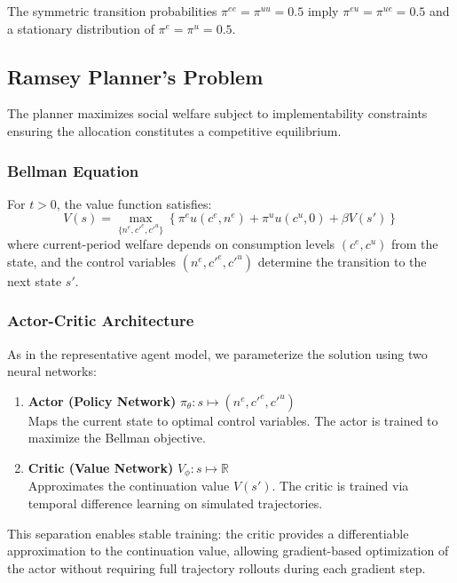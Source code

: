 \noindent The symmetric transition probabilities $\pi^{ee} = \pi^{uu} = 0.5$ imply $\pi^{eu} = \pi^{ue} = 0.5$ and a stationary distribution of $\pi^e = \pi^u = 0.5$.


\subsection{Ramsey Planner's Problem}

The planner maximizes social welfare subject to implementability constraints ensuring the allocation constitutes a competitive equilibrium.

\subsubsection{Bellman Equation}
For $t > 0$, the value function satisfies:
\begin{equation}\label{eq:bellman_ha}
    V(s) = \max_{\{n^e, c'^e, c'^u\}} \left\{ \pi^e u(c^e, n^e) + \pi^u u(c^u, 0) + \beta V(s') \right\}
\end{equation}
where current-period welfare depends on consumption levels $(c^e, c^u)$ from the state, and the control variables $(n^e, c'^e, c'^u)$ determine the transition to the next state $s'$.

\subsubsection{Actor-Critic Architecture}
As in the representative agent model, we parameterize the solution using two neural networks:
\begin{enumerate}
    \item \textbf{Actor (Policy Network)} $\pi_\theta: s \mapsto (n^e, c'^e, c'^u)$\\
    Maps the current state to optimal control variables. The actor is trained to maximize the Bellman objective.
    
    \item \textbf{Critic (Value Network)} $V_\phi: s \mapsto \mathbb{R}$\\
    Approximates the continuation value $V(s')$. The critic is trained via temporal difference learning on simulated trajectories.
\end{enumerate}

This separation enables stable training: the critic provides a differentiable approximation to the continuation value, allowing gradient-based optimization of the actor without requiring full trajectory rollouts during each gradient step.

